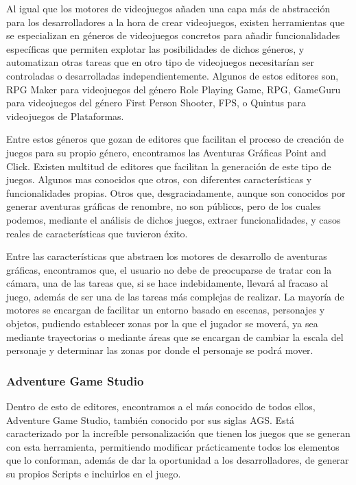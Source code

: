 Al igual que los motores de videojuegos añaden una capa más de abstracción para los desarrolladores a la hora de crear videojuegos, existen herramientas que se especializan en géneros de videojuegos concretos para añadir funcionalidades específicas que permiten explotar las posibilidades de dichos géneros, y automatizan otras tareas que en otro tipo de videojuegos necesitarían ser controladas o desarrolladas independientemente. Algunos de estos editores son, RPG Maker para videojuegos del género Role Playing Game, RPG, GameGuru para videojuegos del género First Person Shooter, FPS, o Quintus para videojuegos de Plataformas.

Entre estos géneros que gozan de editores que facilitan el proceso de creación de juegos para su propio género, encontramos las Aventuras Gráficas Point and Click. Existen multitud de editores que facilitan la generación de este tipo de juegos. Algunos mas conocidos que otros, con diferentes características y funcionalidades propias. Otros que, desgraciadamente, aunque son conocidos por generar aventuras gráficas de renombre, no son públicos, pero de los cuales podemos, mediante el análisis de dichos juegos, extraer funcionalidades, y casos reales de características que tuvieron éxito.

Entre las características que abstraen los motores de desarrollo de aventuras gráficas, encontramos que, el usuario no debe de preocuparse de tratar con la cámara, una de las tareas que, si se hace indebidamente, llevará al fracaso al juego, además de ser una de las tareas más complejas de realizar. La mayoría de motores se encargan de facilitar un entorno basado en escenas, personajes y objetos, pudiendo establecer zonas por la que el jugador se moverá, ya sea mediante trayectorias o mediante áreas que se encargan de cambiar la escala del personaje y determinar las zonas por donde el personaje se podrá mover.

\subsubsection{Adventure Game Studio}
\label{adventuregamestudio}

Dentro de esto de editores, encontramos a el más conocido de todos ellos, Adventure Game Studio, también conocido por sus siglas AGS. Está caracterizado por la increíble personalización que tienen los juegos que se generan con esta herramienta, permitiendo modificar prácticamente todos los elementos que lo conforman, además de dar la oportunidad a los desarrolladores, de generar su propios Scripts e incluirlos en el juego. 


